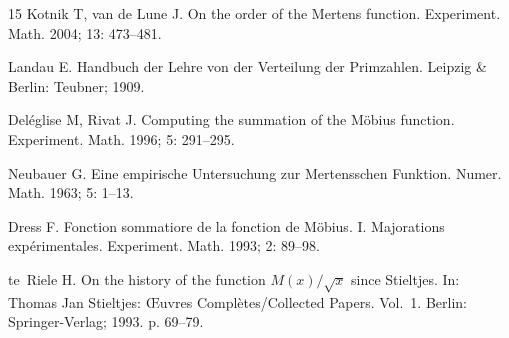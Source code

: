 \documentclass[10pt]{amsart}
\begin{document}
\begin{thebibliography}{15}
{Kotnik T, van de Lune J}.
{On the order of the Mertens function}. 
{Experiment. Math.}
2004; {13}: 473--481. 

{Landau E}. 
{Handbuch der Lehre von der Verteilung der Primzahlen}. 
Leipzig \& Berlin: Teubner; 1909.

{Del\'eglise M, Rivat J}.
{Computing the summation of the M\"obius function}.
{Experiment. Math.} %
1996; {5}: 291--295.

{Neubauer G}. 
{Eine empirische Untersuchung zur Mertensschen Funktion}. 
{Numer. Math.} %
1963; {5}: 1--13. 

{Dress F}. 
{Fonction sommatiore de la fonction de M\"obius. I. Majorations exp\'erimentales}. 
{Experiment. Math.} 
1993; {2}: 89--98. 

{te~Riele H}. 
{On the history of the function $M(x)/\sqrt{x}$ since Stieltjes}. 
In: Thomas Jan Stieltjes: {\OE}uvres Compl\`etes/Collected Papers. Vol.~1. 
Berlin: Springer-Verlag; 1993. p. 69--79.

\end{thebibliography}

\thispagestyle{final}

\end{document}
